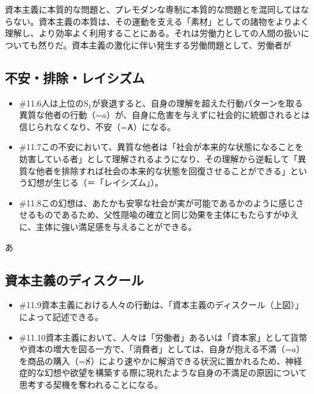 資本主義に本質的な問題と、プレモダンな専制に本質的な問題とを混同してはならない。資本主義の本質は、その運動を支える「素材」としての諸物をよりよく理解し、より効率よく利用することにある。それは労働力としての人間の扱いについても然りだ。資本主義の激化に伴い発生する労働問題として、労働者が

\subsection{不安・排除・レイシズム}\label{ux4e0dux5b89ux6392ux9664ux30ecux30a4ux30b7ux30baux30e0}

\begin{note}{}
  \begin{itemize}
    \tightlist
    \item{\#11.6}人は上位の$\textrm{S}_1$が衰退すると、自身の理解を超えた行動パターンを取る異質な他者の行動（=$a$）が、自身に危害を与えずに社会的に統御されるとは信じられなくなり、不安（=Ⱥ）になる。
    \item{\#11.7}この不安において、異質な他者は「社会が本来的な状態になることを妨害している者」として理解されるようになり、その理解から逆転して「異質な他者を排除すれば社会の本来的な状態を回復させることができる」という幻想が生じる（＝「レイシズム」）。
    \item{\#11.8}この幻想は、あたかも安寧な社会が実が可能であるかのように感じさせるものであるため、父性隠喩の確立と同じ効果を主体にもたらすがゆえに、主体に強い満足感を与えることができる。
  \end{itemize}
\end{note}

あ

\subsection{資本主義のディスクール}\label{ux8cc7ux672cux4e3bux7fa9ux306eux30c7ux30a3ux30b9ux30afux30fcux30eb}

\begin{note}{}
  \begin{itemize}
    \tightlist
    \item{\#11.9}資本主義における人々の行動は、「資本主義のディスクール（上図）」によって記述できる。
    \item{\#11.10}資本主義において、人々は「労働者」あるいは「資本家」として貨幣や資本の増大を図る一方で、「消費者」としては、自身が抱える不満（=$a$）を商品の購入（=$\cancel{\textrm{S}}$）により速やかに解消できる状況に置かれるため、神経症的な幻想や欲望を構築する際に現れたような自身の不満足の原因について思考する契機を奪われることになる。
  \end{itemize}
\end{note}

